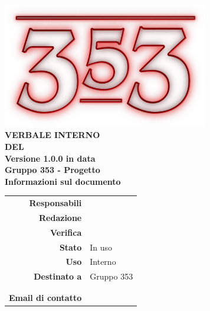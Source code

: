 \documentclass[openany, a4paper, 12pt]{report}
\begin{document}
\begin{titlepage}
	\centering
	\vfill
	{
		\bfseries
		\vskip2cm
		\includegraphics[width=9cm]{../../common/images/logo.png} \\
		\vfill
		\Huge{VERBALE INTERNO\\DEL {}}\\
		\vfill
		\Large Versione 1.0.0 in data \\
		\large Gruppo 353 - Progetto \progetto \\
		\vfill
		\normalsize Informazioni sul documento\\
		\begin{table}[htbp]
			\centering
			\renewcommand\arraystretch{1.2}
			\begin{tabular}{r|l}
				\hline
				\textbf{Responsabili}	& \Riccardo\\
				\textbf{Redazione} 		& \Davide \\
				\textbf{Verifica} 		& \Parwinder\\
				
				\textbf{Stato} 			& In uso\\
				\textbf{Uso}			& Interno\\
				\textbf{Destinato a}   	& Gruppo 353\\
										& \Vardanega\\
										& \Cardin\\
				
				\textbf{Email di contatto}	& \mailgroup
			\end{tabular}
		\end{table}
		\vfill 
	}    
\end{titlepage}
\newpage
{}

 
\end{document}
